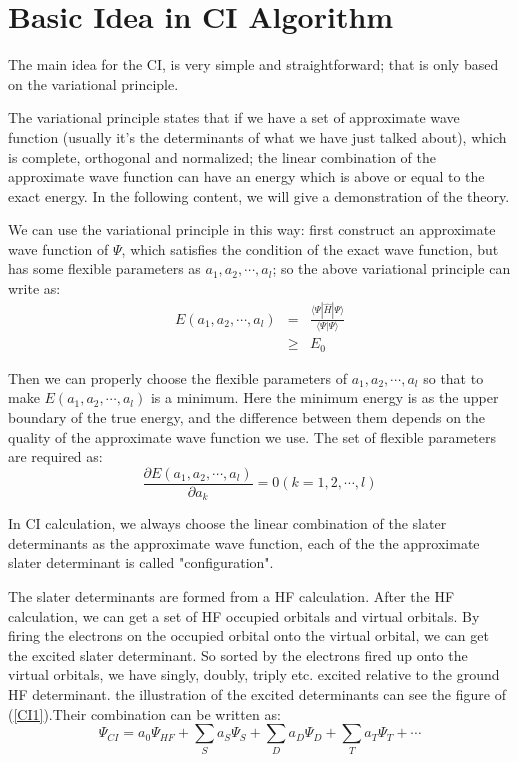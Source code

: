 \section{Basic Idea in CI Algorithm}
%
%
%
The main idea for the CI, is very simple and straightforward; that is
only based on the variational principle.

The variational principle states that if we have a set of approximate
wave function (usually it's the determinants of what we have just
talked about), which is complete, orthogonal and normalized; the
linear combination of the approximate wave function can have an energy
which is above or equal to the exact energy. In the following content,
we will give a demonstration of the theory.

We can use the variational principle in this way: first construct an
approximate wave function of $\Psi$, which satisfies the condition of
the exact wave function, but has some flexible parameters as $a_{1},
a_{2}, \cdots, a_{l}$; so the above variational principle can write
as:
\begin{eqnarray} \label{CIeq:1}
  E(a_{1}, a_{2}, \cdots, a_{l}) &=&  \frac{\langle \Psi|\hat{H}| \Psi
    \rangle} {\langle \Psi|\Psi \rangle} \nonumber \\
  & \geq & E_{0}
\end{eqnarray}

Then we can properly choose the flexible parameters of $a_{1}, a_{2},
\cdots, a_{l}$ so that to make $E(a_{1}, a_{2}, \cdots, a_{l})$ is a
minimum. Here the minimum energy is as the upper boundary of the true
energy, and the difference between them depends on the quality of the
approximate wave function we use. The set of flexible parameters are
required as:
\begin{equation}\label{CIeq:2}
  \frac{\partial E(a_{1}, a_{2}, \cdots, a_{l})}{\partial a_{k}} = 0
  (k= 1,2, \cdots, l)
\end{equation}

In CI calculation, we always choose the linear combination of the
slater determinants as the approximate wave function, each of the the
approximate slater determinant is called "configuration".

The slater determinants are formed from a HF calculation. After the HF
calculation, we can get a set of HF occupied orbitals and virtual
orbitals. By firing the electrons on the occupied orbital onto the
virtual orbital, we can get the excited slater determinant. So sorted
by the electrons fired up onto the virtual orbitals, we have singly,
doubly, triply etc. excited relative to the ground HF determinant. the
illustration of the excited determinants can see the figure of
(\ref{CI1}).Their combination can be written as:
\begin{equation}\label{CIeq:3}
  \Psi_{CI} = a_{0}\Psi_{HF} + \sum _{S}a_{S}\Psi_{S} + \sum
  _{D}a_{D}\Psi_{D} + \sum _{T}a_{T}\Psi_{T} + \cdots
\end{equation}

